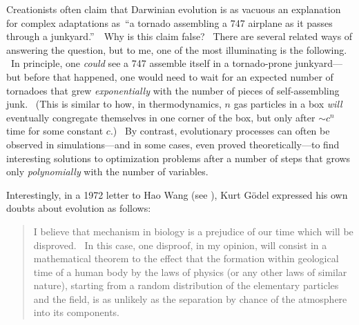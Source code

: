 \documentclass[11pt,onecolumn]{article}%
\begin{document}
Creationists often claim that Darwinian evolution is as vacuous an explanation
for complex adaptations as\ \textquotedblleft a tornado assembling a 747
airplane as it passes through a junkyard.\textquotedblright\ \ Why is this
claim false? \ There are several related ways of answering the question, but
to me, one of the most illuminating is the following. \ In principle, one
\textit{could} see a 747 assemble itself in a tornado-prone junkyard---but
before that happened, one would need to wait for an expected number of
tornadoes that grew \textit{exponentially} with the number of pieces of
self-assembling junk. \ (This is similar to how, in thermodynamics, $n$ gas
particles in a box \textit{will} eventually congregate themselves in one
corner of the box, but only after $\sim c^{n}$ time for some constant $c$.)
\ By contrast, evolutionary processes can often be observed in
simulations---and in some cases, even proved theoretically---to find
interesting solutions to optimization problems after a number of steps that
grows only \textit{polynomially} with the number of variables.

Interestingly, in a 1972 letter to Hao Wang (see \cite[p. 192]{wang}), Kurt
G\"{o}del expressed his own doubts about evolution as follows:

\begin{quotation}
\noindent I believe that mechanism in biology is a prejudice of our time which
will be disproved. \ In this case, one disproof, in my opinion, will consist
in a mathematical theorem to the effect that the formation within geological
time of a human body by the laws of physics (or any other laws of similar
nature), starting from a random distribution of the elementary particles and
the field, is as unlikely as the separation by chance of the atmosphere into
its components.
\end{quotation}
\end{document}
